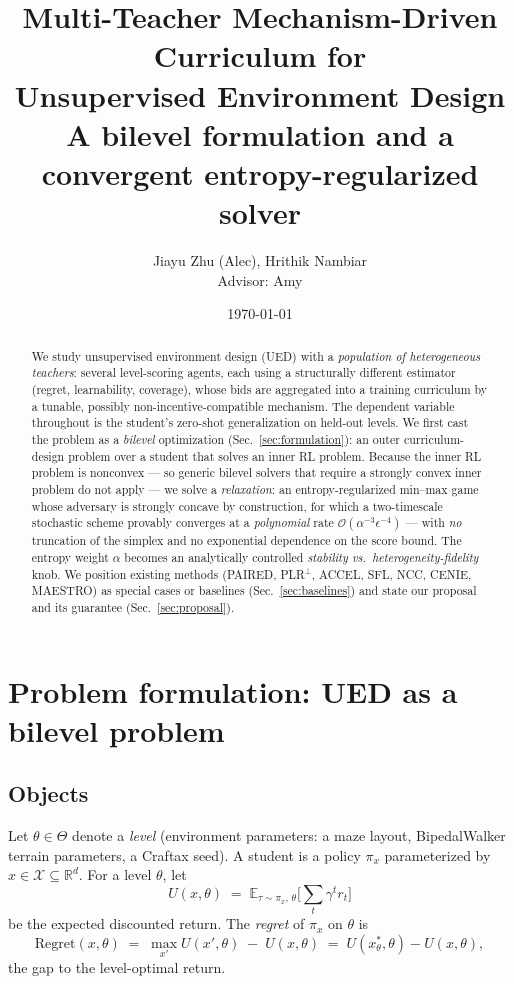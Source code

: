 \documentclass[11pt]{article}
\title{\textbf{Multi-Teacher Mechanism-Driven Curriculum for\\ Unsupervised Environment Design}\\[4pt]
\large A bilevel formulation and a convergent entropy-regularized solver}
\author{Jiayu Zhu (Alec), Hrithik Nambiar \\ \small Advisor: Amy }
\date{\today}
\newcommand{\reals}{\mathbb{R}}
\newcommand{\expect}{\mathbb{E}}
\newcommand{\level}{\theta}        %
\newcommand{\levelset}{\Theta}     %
\newcommand{\policy}{\pi}
\newcommand{\param}{x}             %
\newcommand{\paramset}{\mathcal{X}}
\newcommand{\reg}{\mathrm{Regret}}
\begin{document}
\maketitle

\begin{abstract}
We study unsupervised environment design (UED) with a \emph{population of heterogeneous teachers}: several level-scoring agents, each using a structurally different estimator (regret, learnability, coverage), whose bids are aggregated into a training curriculum by a tunable, possibly non-incentive-compatible mechanism. The dependent variable throughout is the student's zero-shot generalization on held-out levels. We first cast the problem as a \emph{bilevel} optimization (Sec.~\ref{sec:formulation}): an outer curriculum-design problem over a student that solves an inner RL problem. Because the inner RL problem is nonconvex --- so generic bilevel solvers that require a strongly convex inner problem do not apply --- we solve a \emph{relaxation}: an entropy-regularized min--max game whose adversary is strongly concave by construction, for which a two-timescale stochastic scheme provably converges at a \emph{polynomial} rate $\mathcal{O}(\alpha^{-3}\epsilon^{-4})$ --- with \emph{no} truncation of the simplex and no exponential dependence on the score bound. The entropy weight $\alpha$ becomes an analytically controlled \emph{stability vs.\ heterogeneity-fidelity} knob. We position existing methods (PAIRED, PLR$^\perp$, ACCEL, SFL, NCC, CENIE, MAESTRO) as special cases or baselines (Sec.~\ref{sec:baselines}) and state our proposal and its guarantee (Sec.~\ref{sec:proposal}).
\end{abstract}

\section{Problem formulation: UED as a bilevel problem}
\label{sec:formulation}

\subsection{Objects}
Let $\level \in \levelset$ denote a \emph{level} (environment parameters: a maze layout, BipedalWalker terrain parameters, a Craftax seed). A student is a policy $\policy_{\param}$ parameterized by $\param \in \paramset \subseteq \reals^{d}$. For a level $\level$, let
\[
  U(\param,\level) \;=\; \expect_{\tau \sim \policy_{\param},\,\level}\!\Big[\textstyle\sum_{t} \gamma^{t} r_t\Big]
\]
be the expected discounted return. The \emph{regret} of $\policy_\param$ on $\level$ is
\begin{equation}
  \reg(\param,\level) \;=\; \max_{\param'} U(\param',\level) \;-\; U(\param,\level)
  \;=\; U(\param^{*}_{\level},\level) - U(\param,\level),
  \label{eq:regret}
\end{equation}
the gap to the level-optimal return.
\end{document}
